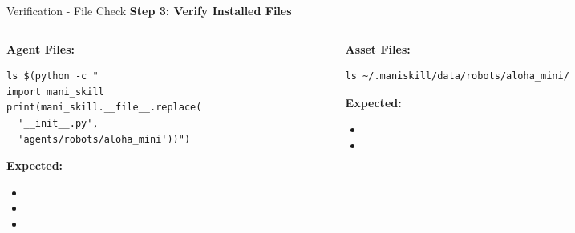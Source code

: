 \documentclass[aspectratio=169]{beamer}
\begin{document}
\begin{frame}[fragile]{Verification - File Check}
\textbf{Step 3: Verify Installed Files}

\vspace{0.3cm}

\begin{columns}
\begin{column}{0.5\textwidth}
\textbf{Agent Files:}
\begin{lstlisting}[basicstyle=\ttfamily\scriptsize]
ls $(python -c "
import mani_skill
print(mani_skill.__file__.replace(
  '__init__.py',
  'agents/robots/aloha_mini'))")
\end{lstlisting}

\vspace{0.2cm}

\textbf{Expected:}
\begin{itemize}
    \item {}
    \item {}
    \item {}
\end{itemize}
\end{column}
\begin{column}{0.5\textwidth}
\textbf{Asset Files:}
\begin{lstlisting}[basicstyle=\ttfamily\scriptsize]
ls ~/.maniskill/data/robots/aloha_mini/
\end{lstlisting}

\vspace{0.2cm}

\textbf{Expected:}
\begin{itemize}
    \item {}
    \item {}
\end{itemize}
\end{column}
\end{columns}
\end{frame}
\end{document}
